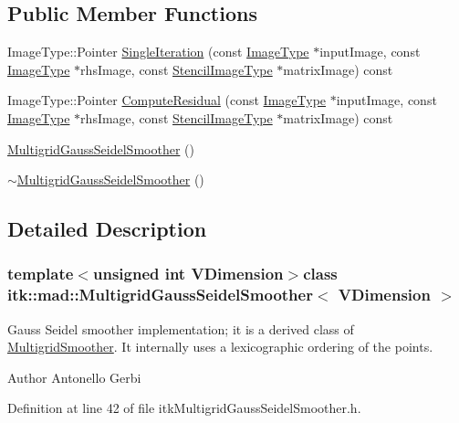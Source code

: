 \subsection*{Public Member Functions}
\begin{DoxyCompactItemize}
\item 
Image\-Type\-::\-Pointer \hyperlink{classitk_1_1mad_1_1_multigrid_gauss_seidel_smoother_a4c4efcf4c1d207014ec08a58f05cbea4}{Single\-Iteration} (const \hyperlink{class_image}{Image\-Type} $\ast$input\-Image, const \hyperlink{class_image}{Image\-Type} $\ast$rhs\-Image, const \hyperlink{classitk_1_1mad_1_1_stencil_image}{Stencil\-Image\-Type} $\ast$matrix\-Image) const 
\item 
Image\-Type\-::\-Pointer \hyperlink{classitk_1_1mad_1_1_multigrid_gauss_seidel_smoother_a918b18641139d9e0cb99f97e751e2103}{Compute\-Residual} (const \hyperlink{class_image}{Image\-Type} $\ast$input\-Image, const \hyperlink{class_image}{Image\-Type} $\ast$rhs\-Image, const \hyperlink{classitk_1_1mad_1_1_stencil_image}{Stencil\-Image\-Type} $\ast$matrix\-Image) const 
\item 
\hyperlink{classitk_1_1mad_1_1_multigrid_gauss_seidel_smoother_a5ac6b70226e4af8bdfd115ffb52ab5ac}{Multigrid\-Gauss\-Seidel\-Smoother} ()
\item 
\hyperlink{classitk_1_1mad_1_1_multigrid_gauss_seidel_smoother_af85c0d56057fe68365a6b6b4c45f7698}{$\sim$\-Multigrid\-Gauss\-Seidel\-Smoother} ()
\end{DoxyCompactItemize}


\subsection{Detailed Description}
\subsubsection*{template$<$unsigned int V\-Dimension$>$class itk\-::mad\-::\-Multigrid\-Gauss\-Seidel\-Smoother$<$ V\-Dimension $>$}

Gauss Seidel smoother implementation; it is a derived class of \hyperlink{classitk_1_1mad_1_1_multigrid_smoother}{Multigrid\-Smoother}. It internally uses a lexicographic ordering of the points. 

\begin{DoxyAuthor}{Author}
Antonello Gerbi 
\end{DoxyAuthor}


Definition at line 42 of file itk\-Multigrid\-Gauss\-Seidel\-Smoother.\-h.



